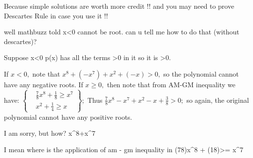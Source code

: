 \begin{solution}
	Because simple solutions are worth more credit !!
and you may need to prove Descartes Rule in case you use it !!
\end{solution}



\begin{solution}
	well mathbuzz told x<0 cannot be root. can u tell me how to do that (without descartes)?
\end{solution}



\begin{solution}
	Suppose x<0 p(x) has all the terms >0 in it so it is >0.
\end{solution}



\begin{solution}
	\begin{tcolorbox}If $x<0,$ note that $x^8+(-x^7)+x^2+(-x)>0,$ so the polynomial cannot have any negative roots.
If $x\geq 0,$ then note that from AM-GM inequality we have:
$\left\{\begin{aligned}& \frac 78 x^8+\frac 18\geq x^7\\& x^2+\frac 14\geq x\end{aligned}\right\} ;$
Thus $\frac 78x^8-x^7+x^2-x+\frac 38>0;$ so again, the original polynomial cannot have any positive roots.\end{tcolorbox}
    

I am sorry, but how? 
  x^8+\geq x^7\\
\end{solution}



\begin{solution}
	I mean where is the application of am - gm inequality in (7\/8)x^8  + (1\/8)>= x^7








\end{solution}



